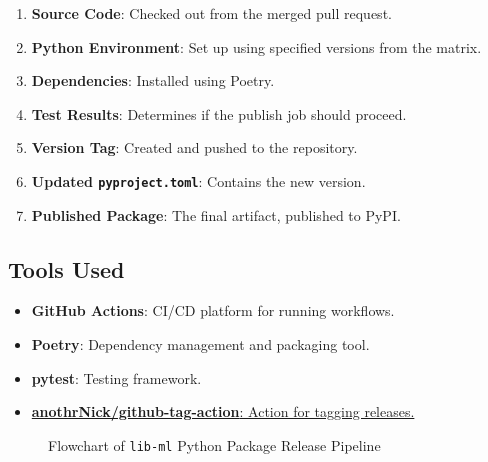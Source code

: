 \begin{enumerate}
    \item \textbf{Source Code}: Checked out from the merged pull request.
    \item \textbf{Python Environment}: Set up using specified versions from the matrix.
    \item \textbf{Dependencies}: Installed using Poetry.
    \item \textbf{Test Results}: Determines if the publish job should proceed.
    \item \textbf{Version Tag}: Created and pushed to the repository.
    \item \textbf{Updated \texttt{pyproject.toml}}: Contains the new version.
    \item \textbf{Published Package}: The final artifact, published to PyPI.
\end{enumerate}

\subsection{Tools Used}

\begin{itemize}
    \item \textbf{GitHub Actions}: CI/CD platform for running workflows.
    \item \textbf{Poetry}: Dependency management and packaging tool.
    \item \textbf{pytest}: Testing framework.
    \item \href{https://github.com/marketplace/actions/github-tag-bump}{\textbf{anothrNick/github-tag-action}: Action for tagging releases.}
\end{itemize}

\begin{figure}[h!]
    \centering
    \caption{Flowchart of \texttt{lib-ml} Python Package Release Pipeline}
    \label{fig:lib-ml-pipeline}
\end{figure}

